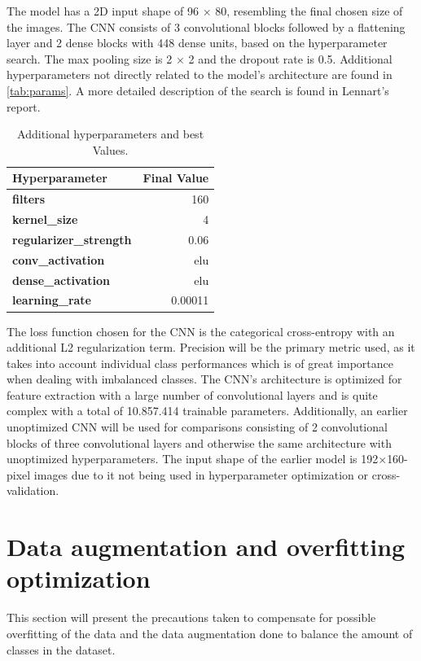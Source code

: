 \noindent
The model has a 2D input shape of 96 $\times$ 80, resembling the final chosen size of the images. The CNN consists of 3 convolutional blocks followed by a flattening layer and 2 dense blocks with 448 dense units, based on the hyperparameter search. The max pooling size is 2 $\times$ 2 and the dropout rate is 0.5. Additional hyperparameters not directly related to the model's architecture are found in \autoref{tab:params}. A more detailed description of the search is found in Lennart's report.
\begin{table}[H]
    \caption{Additional hyperparameters and best Values.}
    \vspace{0.2cm}
    \label{tab:params}
    \centering
    \begin{adjustbox}{max width=\textwidth}
    \begin{tabular}{l|r}
        \toprule
        \textbf{Hyperparameter}  & \textbf{Final Value} \\
        \midrule
        \textbf{filters} & 160 \\
        \textbf{kernel\_size}  & 4 \\
        \textbf{regularizer\_strength}  & 0.06 \\
        \textbf{conv\_activation}  & elu \\
        \textbf{dense\_activation} & elu \\
        \textbf{learning\_rate} & 0.00011 \\
        \bottomrule
    \end{tabular}
    \end{adjustbox}
\end{table}
\noindent
The loss function chosen for the CNN is the categorical cross-entropy with an additional L2 regularization term. Precision will be the primary metric used, as it takes into account individual class performances which is of great importance when dealing with imbalanced classes.
The CNN's architecture is optimized for feature extraction with a large number of convolutional layers and is quite complex with a total of 10.857.414 trainable parameters. Additionally, an earlier unoptimized CNN will be used for comparisons consisting of 2 convolutional blocks of three convolutional layers and otherwise the same architecture with unoptimized hyperparameters. The input shape of the earlier model is 192$\times$160-pixel images due to it not being used in hyperparameter optimization or cross-validation.
\section{Data augmentation and overfitting optimization}
    \label{sec:2}
This section will present the precautions taken to compensate for possible overfitting of the data and the data augmentation done to balance the amount of classes in the dataset.
